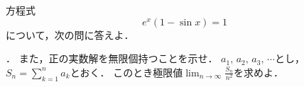 \documentclass[../../main.tex]{subfiles}
\begin{document}
方程式
\[ e^x(1-\sin x)=1 \]
について，次の問に答えよ．
\begin{enumerate}
  ．
    また，正の実数解を無限個持つことを示せ．
    $a_1, \, a_2, \, a_3, \, \cdots$とし，
    $\displaystyle S_n=\sum_{k=1}^na_k$とおく．
    このとき極限値$\displaystyle\lim_{n\to\infty}\frac{S_n}{n^2}$を求めよ．
\end{enumerate}
\end{document}
